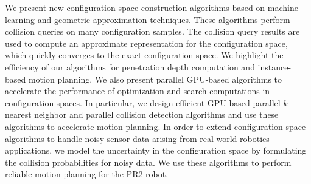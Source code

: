 We present new configuration space construction algorithms based on machine learning and geometric approximation techniques. These algorithms perform collision queries on many configuration samples. The collision query results
are used to compute an approximate representation for the configuration space, which quickly converges to the exact configuration space. We highlight the efficiency of our algorithms for penetration depth computation and
instance-based motion planning. We also present parallel GPU-based algorithms to accelerate the performance of optimization and search computations in configuration spaces. In particular, we design efficient GPU-based parallel $k$-nearest neighbor and parallel collision detection algorithms and use these algorithms
to accelerate motion planning. In order to extend configuration space algorithms to handle noisy sensor data arising from real-world robotics applications,
we model the uncertainty in the configuration space by formulating the collision probabilities for noisy data.
We use these algorithms to perform reliable motion planning for the PR2 robot.

